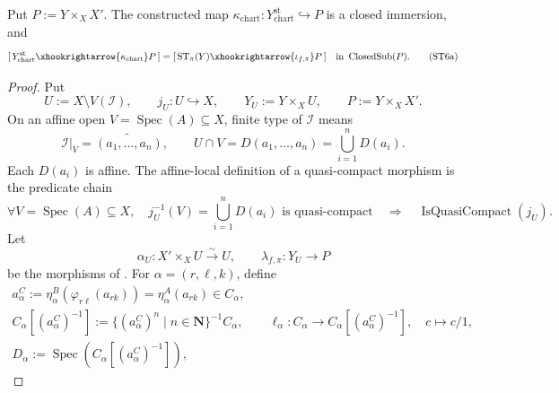 \begin{proposition}
  \label{prop:nagata-strict-transform-closed-fiber-product}
  \lean{}

  Put $P:=Y\times_XX'$.  The constructed map
  $\kappa_{\mathrm{chart}}\colon
    Y^{\mathrm{st}}_{\mathrm{chart}}\hookrightarrow P$
  is a closed immersion, and
  \[
    [\,Y^{\mathrm{st}}_{\mathrm{chart}}
      \xhookrightarrow{\kappa_{\mathrm{chart}}}P\,]
      =[\,\operatorname{ST}_\pi(Y)
      \xhookrightarrow{\iota_{f,\pi}}P\,]
      \quad\text{in }\operatorname{ClosedSub}(P).                \tag{ST6a}
  \]
\end{proposition}

\begin{proof}
  Put
  \[
    U:=X\setminus V(\mathcal I),
    \qquad j_U\colon U\hookrightarrow X,
    \qquad Y_U:=Y\times_XU,
    \qquad P:=Y\times_XX'.
  \]
  On an affine open $V=\operatorname{Spec}(A)\subseteq X$, finite type of
  $\mathcal I$ means
  \[
    \mathcal I|_V=\widetilde{(a_1,\ldots,a_n)},
    \qquad
    U\cap V=D(a_1,\ldots,a_n)=\bigcup_{i=1}^{n}D(a_i).
  \]
  Each $D(a_i)$ is affine.  The affine-local definition of a quasi-compact
  morphism is the predicate chain
  \[
    \forall V=\operatorname{Spec}(A)\subseteq X,\quad
      j_U^{-1}(V)=\bigcup_{i=1}^{n}D(a_i)\text{ is quasi-compact}
    \quad\Longrightarrow\quad
      \operatorname{IsQuasiCompact}(j_U).                       \tag{ST5c}
  \]
  Let
  \[
    \alpha_U\colon X'\times_XU\xrightarrow{\sim}U,
    \qquad
    \lambda_{f,\pi}\colon Y_U\to P
  \]
  be the morphisms of
  .
  For $\alpha=(r,\ell,k)$, define
  \[
  \begin{gathered}
    a^C_\alpha:=
      \eta^B_\alpha(\varphi_{r\ell}(a_{rk}))
      =\eta^A_\alpha(a_{rk})\in C_\alpha,\\
    C_\alpha[(a^C_\alpha)^{-1}]
      :=\{(a^C_\alpha)^n\mid n\in\mathbf N\}^{-1}C_\alpha,\qquad
    \ell_\alpha\colon C_\alpha\to C_\alpha[(a^C_\alpha)^{-1}],
      \quad c\mapsto c/1,\\
    D_\alpha:=\operatorname{Spec}(C_\alpha[(a^C_\alpha)^{-1}]),\qquad

\end{gathered}\]
\end{proof}
